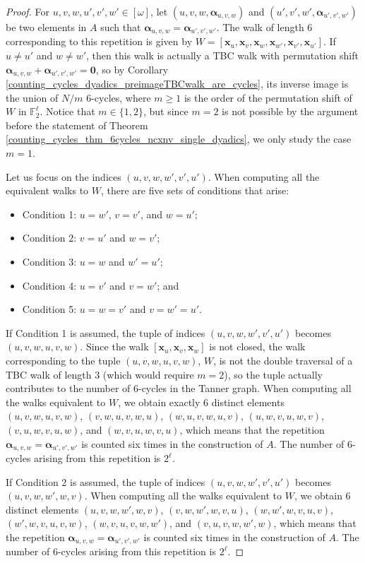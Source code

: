 \documentclass[10pt,a4paper]{amsart}
\newcommand{\balpha}{{\boldsymbol \alpha}}
\newcommand{\bx}{{\mathbf x}}
\newcommand{\bzero}{\mathbf{0}}
\begin{document}
\begin{proof}
For $u,v,w,u',v',w'\in[\omega]$, let $(u,v,w,\balpha_{u,v,w})$ and $(u',v',w',\balpha_{u',v',w'})$ be two elements in $A$ such that $\balpha_{u,v,w}=\balpha_{u',v',w'}$. The walk of length 6 corresponding to this repetition is given by $W=[\bx_{u},\bx_{v},\bx_{w},\bx_{w'},\bx_{v'},\bx_{u'}]$. If $u\neq u'$ and $w\neq w'$, then this walk is actually a TBC walk with permutation shift $\balpha_{u,v,w}+\balpha_{u',v',w'}=\bzero$, so by Corollary \ref{counting_cycles_dyadics_preimageTBCwalk_are_cycles}, its inverse image is the union of $N/m$ 6-cycles, where $m\geq 1$ is the order of the permutation shift of $W$ in $\mathbb{F}_2^\ell$. Notice that $m\in\{1,2\}$, but since $m=2$ is not possible by the argument before the statement of Theorem \ref{counting_cycles_thm_6cycles_ncxnv_single_dyadics}, we only study the case $m=1$. 

Let us focus on the indices $(u,v,w,w',v',u')$. When computing all the equivalent walks to $W$, there are five sets of conditions that arise:
\begin{itemize}
\item Condition 1: $u=w'$, $v=v'$, and $w=u'$;
\item Condition 2: $v=u'$ and $w=v'$;
\item Condition 3: $u=w$ and $w'=u'$;
\item Condition 4: $u=v'$ and $v=w'$; and
\item Condition 5: $u=w=v'$ and $v=w'=u'$.
\end{itemize} 
If Condition 1 is assumed, the tuple of indices $(u,v,w,w',v',u')$ becomes $(u,v,w,u,v,w)$. Since the walk $[\bx_{u},\bx_{v},\bx_{w}]$ is not closed, the walk corresponding to the tuple $(u,v,w,u,v,w)$, $W$, is not the double traversal of a TBC walk of length 3 (which would require $m=2$), so the tuple actually contributes to the number of 6-cycles in the Tanner graph. When computing all the walks equivalent to $W$, we obtain exactly 6 distinct elements $(u,v,w,u,v,w)$, $(v,w,u,v,w,u)$, $(w,u,v,w,u,v)$, $(u,w,v,u,w,v)$, $(v,u,w,v,u,w)$, and $(w,v,u,w,v,u)$, which means that the repetition $\balpha_{u,v,w}=\balpha_{u',v',w'}$ is counted six times in the construction of $A$. The number of 6-cycles arising from this repetition is $2^\ell$.

If Condition 2 is assumed, the tuple of indices $(u,v,w,w',v',u')$ becomes $(u,v,w,w',w,v)$.  
When computing all the walks equivalent to $W$, we obtain 6 distinct elements $(u,v,w,w',w,v)$, $(v,w,w',w,v,u)$, $(w,w',w,v,u,v)$, $(w',w,v,u,v,w)$, $(w,v,u,v,w,w')$, and $(v,u,v,w,w',w)$, which means that the repetition $\balpha_{u,v,w}=\balpha_{u',v',w'}$ is counted six times in the construction of $A$. The number of 6-cycles arising from this repetition is $2^\ell$.


\end{proof}
\end{document}
